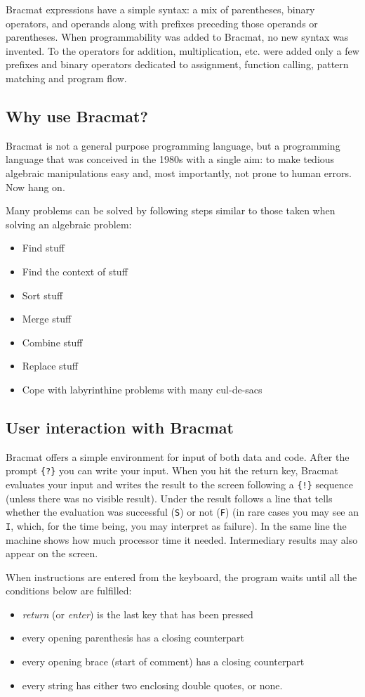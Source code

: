 \documentclass[12pt]{article}
\begin{document}
Bracmat expressions have a simple syntax: a mix of parentheses, binary
operators, and operands along with prefixes preceding those operands
or parentheses. When programmability was added to Bracmat, no new syntax was invented. To the
operators for addition, multiplication, etc. were added only a few prefixes and binary 
operators dedicated to assignment, function calling, pattern matching and program flow.

\subsection{Why use Bracmat?}

Bracmat is not a general purpose programming language, but a
programming language that was conceived in the 1980s with a single
aim: to make tedious algebraic manipulations easy and, most
importantly, not prone to human errors. Now hang on.

Many problems can be solved by following steps similar to those taken when solving an algebraic problem:
\begin{itemize}
\item Find stuff
\item Find the context of stuff
\item Sort stuff
\item Merge stuff
\item Combine stuff
\item Replace stuff
\item Cope with labyrinthine problems with many cul-de-sacs
\end{itemize}

\subsection{User interaction with Bracmat}

Bracmat offers a simple environment for input of both data and
code. After the prompt \verb|{?}| you can write your input. When you
hit the return key, Bracmat evaluates your input and writes the result
to the screen following a \verb|{!}| sequence (unless there was no
visible result). Under the result follows a line that tells whether
the evaluation was successful (\verb|S|) or not (\verb|F|) (in rare
cases you may see an \verb|I|, which, for the time being, you may
interpret as failure). In the same line the machine shows how much
processor time it needed. Intermediary results may also appear on the
screen.

When instructions are entered from the keyboard, the program waits
until all the conditions below are fulfilled:
\begin{itemize}
\item \emph{return} (or \emph{enter}) is the last key that has been pressed
\item every opening parenthesis has a closing counterpart
\item every opening brace (start of comment) has a closing counterpart
\item every string has either two enclosing double quotes, or none.
\end{itemize}
\end{document}
